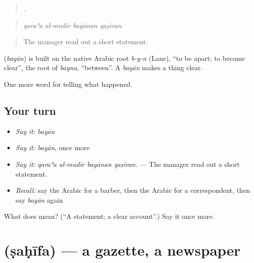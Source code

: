 \begin{quote}
   .
\end{quote}

\begin{quote}
\emph{qaraʾa al-mudīr bayānan qaṣīran.}
\end{quote}

\begin{quote}
The manager read out a short statement.
\end{quote}

\begin{cousinweb}
\textbf{} (\emph{bayān}) is built on the native Arabic root \emph{b-y-n} (Lane), \textquotedblleft{}to be apart; to become clear\textquotedblright{}, the root of \emph{bayna}, \textquotedblleft{}between\textquotedblright{}. A \emph{bayān} makes a thing clear.
\end{cousinweb}

\begin{grammarlens}[title={What you've built}]
One more word for telling what happened.
\end{grammarlens}

\subsection*{Your turn}
\begin{itemize}
\raggedright
  \item \emph{Say it:} \emph{bayān}
  \item \emph{Say it:} \emph{bayān}, once more
  \item \emph{Say it:} \emph{qaraʾa al-mudīr bayānan qaṣīran.} — The manager read out a short statement.
  \item \emph{Recall:} say the Arabic for a barber, then the Arabic for a correspondent, then say \emph{bayān} again
\end{itemize}

\begin{tcolorbox}[breakable,colback=teal!4,colframe=teal!35!black,title={Before you move on}]
What does  mean? (\textquotedblleft{}A statement; a clear account\textquotedblright{}.) Say it once more.
\end{tcolorbox}
\section[\texorpdfstring{\ar{صحيفة} (ṣaḥīfa)}{صحيفة (ṣaḥīfa)}]{ (ṣaḥīfa) — a gazette, a newspaper}

